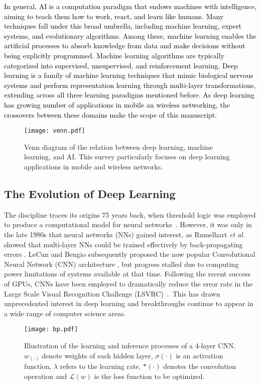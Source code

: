 \documentclass[journal,comsoc,letter]{IEEEtran}
\newcommand{\rev}[1]{\textcolor{black}{#1}}
\begin{document}
\rev{In general, AI is a computation paradigm that endows machines with intelligence, aiming to teach them how to work, react, and learn like humans. Many techniques fall under this broad umbrella, including machine learning, expert systems, and evolutionary algorithms. Among these, machine learning enables the artificial processes to absorb knowledge from data and make decisions without being explicitly programmed. Machine learning algorithms are typically categorized into supervised, unsupervised, and reinforcement learning. Deep learning is a family of machine learning techniques that mimic biological nervous systems and perform representation learning through multi-layer transformations, extending across all three learning paradigms mentioned before. As deep learning has growing number of applications in mobile an wireless networking, the crossovers between these domains make the scope of this manuscript.}
\begin{figure}[htb]
\begin{center}
\texttt{[image: venn.pdf]}
\end{center}
\caption{\label{fig:venn} Venn diagram of the relation between deep learning, machine learning, and AI. This survey particularly focuses on deep learning applications in mobile and wireless networks.}
\end{figure}
\subsection{The Evolution of Deep Learning}
The discipline traces its origins 75 years back, when threshold logic was employed to produce a computational model for neural networks~\cite{mcculloch:1943}. However, it was only in the late 1980s that neural networks (NNs) gained interest, as Rumelhart \emph{et al.} showed that multi-layer NNs could be trained effectively by back-propagating errors \cite{williams1986learning}. LeCun and Bengio subsequently proposed the now popular Convolutional Neural Network (CNN) architecture \cite{lecun1995convolutional}, but progress stalled due to computing power limitations of systems available at that time. Following the recent success of GPUs, CNNs have been employed to dramatically reduce the error rate in the Large Scale Visual Recognition Challenge (LSVRC)~\cite{krizhevsky2012imagenet}.~This has drawn unprecedented interest in deep learning and breakthroughs continue to appear in a wide range of computer science areas.
 
\begin{figure}[b]
\begin{center}
\texttt{[image: bp.pdf]}
\end{center}
\caption{\label{fig:bp} Illustration of the learning and inference processes of a 4-layer CNN. $w_{(\cdot)}$ denote weights of each hidden layer, $\sigma(\cdot)$ is an activation function, $\lambda$ refers to the learning rate, $*(\cdot)$ denotes the convolution operation and $\mathcal{L}(w)$ is the loss function to be optimized.}
\end{figure}
\end{document}
